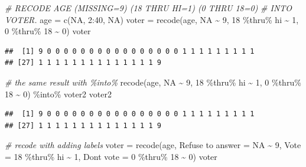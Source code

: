 \documentclass[
]{book}
\newenvironment{Shaded}{\begin{snugshade}}{\end{snugshade}}
\newcommand{\AttributeTok}[1]{\textcolor[rgb]{0.77,0.63,0.00}{#1}}
\newcommand{\CommentTok}[1]{\textcolor[rgb]{0.56,0.35,0.01}{\textit{#1}}}
\newcommand{\ConstantTok}[1]{\textcolor[rgb]{0.00,0.00,0.00}{#1}}
\newcommand{\DecValTok}[1]{\textcolor[rgb]{0.00,0.00,0.81}{#1}}
\newcommand{\FunctionTok}[1]{\textcolor[rgb]{0.00,0.00,0.00}{#1}}
\newcommand{\NormalTok}[1]{#1}
\newcommand{\OtherTok}[1]{\textcolor[rgb]{0.56,0.35,0.01}{#1}}
\newcommand{\SpecialCharTok}[1]{\textcolor[rgb]{0.00,0.00,0.00}{#1}}
\newcommand{\StringTok}[1]{\textcolor[rgb]{0.31,0.60,0.02}{#1}}
\begin{document}
\begin{Shaded}
\begin{Highlighting}[]
\CommentTok{\# RECODE AGE (MISSING=9) (18 THRU HI=1) (0 THRU 18=0)}
\CommentTok{\# INTO VOTER.}
\NormalTok{age }\OtherTok{=} \FunctionTok{c}\NormalTok{(}\ConstantTok{NA}\NormalTok{, }\DecValTok{2}\SpecialCharTok{:}\DecValTok{40}\NormalTok{, }\ConstantTok{NA}\NormalTok{)}
\NormalTok{voter }\OtherTok{=} \FunctionTok{recode}\NormalTok{(age, }\ConstantTok{NA} \SpecialCharTok{\textasciitilde{}} \DecValTok{9}\NormalTok{, }\DecValTok{18} \SpecialCharTok{\%thru\%}\NormalTok{ hi }\SpecialCharTok{\textasciitilde{}} \DecValTok{1}\NormalTok{, }\DecValTok{0} \SpecialCharTok{\%thru\%} \DecValTok{18} \SpecialCharTok{\textasciitilde{}} 
  \DecValTok{0}\NormalTok{)}
\NormalTok{voter}
\end{Highlighting}
\end{Shaded}

\begin{verbatim}
##  [1] 9 0 0 0 0 0 0 0 0 0 0 0 0 0 0 0 0 1 1 1 1 1 1 1 1 1
## [27] 1 1 1 1 1 1 1 1 1 1 1 1 1 1 9
\end{verbatim}

\begin{Shaded}
\begin{Highlighting}[]
\CommentTok{\# the same result with \textquotesingle{}\%into\%\textquotesingle{}}
\FunctionTok{recode}\NormalTok{(age, }\ConstantTok{NA} \SpecialCharTok{\textasciitilde{}} \DecValTok{9}\NormalTok{, }\DecValTok{18} \SpecialCharTok{\%thru\%}\NormalTok{ hi }\SpecialCharTok{\textasciitilde{}} \DecValTok{1}\NormalTok{, }\DecValTok{0} \SpecialCharTok{\%thru\%} \DecValTok{18} \SpecialCharTok{\textasciitilde{}} \DecValTok{0}\NormalTok{) }\SpecialCharTok{\%into\%} 
\NormalTok{  voter2}
\NormalTok{voter2}
\end{Highlighting}
\end{Shaded}

\begin{verbatim}
##  [1] 9 0 0 0 0 0 0 0 0 0 0 0 0 0 0 0 0 1 1 1 1 1 1 1 1 1
## [27] 1 1 1 1 1 1 1 1 1 1 1 1 1 1 9
\end{verbatim}

\begin{Shaded}
\begin{Highlighting}[]
\CommentTok{\# recode with adding labels}
\NormalTok{voter }\OtherTok{=} \FunctionTok{recode}\NormalTok{(age, }\StringTok{\textasciigrave{}}\AttributeTok{Refuse to answer}\StringTok{\textasciigrave{}} \OtherTok{=} \ConstantTok{NA} \SpecialCharTok{\textasciitilde{}} \DecValTok{9}\NormalTok{, }\AttributeTok{Vote =} \DecValTok{18} \SpecialCharTok{\%thru\%} 
\NormalTok{  hi }\SpecialCharTok{\textasciitilde{}} \DecValTok{1}\NormalTok{, }\StringTok{\textasciigrave{}}\AttributeTok{Don\textquotesingle{}t vote}\StringTok{\textasciigrave{}} \OtherTok{=} \DecValTok{0} \SpecialCharTok{\%thru\%} \DecValTok{18} \SpecialCharTok{\textasciitilde{}} \DecValTok{0}\NormalTok{)}
\NormalTok{voter}
\end{Highlighting}
\end{Shaded}
\end{document}
